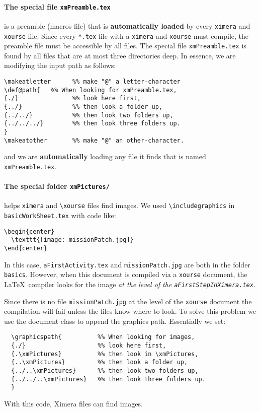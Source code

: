 \documentclass{ximera}
\begin{document}
\paragraph{The special file \texttt{xmPreamble.tex}} is a preamble (macros file) that is \textbf{automatically loaded} by every  \verb!ximera! and \verb!xourse! file.
Since every \verb!*.tex! file with a \verb!ximera! and \verb!xourse! must compile, the
preamble file must be accessible  by all files. The special file
\verb!xmPreamble.tex! is found by all files that are at most three directories
deep. In essence, we are modifying the input path as follows:
\begin{verbatim}
\makeatletter      %% make "@" a letter-character
\def@path{   %% When looking for xmPreamble.tex,
{./}               %% look here first,
{../}              %% then look a folder up,
{../../}           %% then look two folders up,
{../../../}        %% then look three folders up.
}
\makeatother       %% make "@" an other-character.
\end{verbatim}
and we are \textbf{automatically} loading any file it finds that is named \verb!xmPreamble.tex!.



\paragraph{The special folder \texttt{xmPictures/}} helps \verb!ximera! and  \verb!\xourse! files find images.
We used \verb!\includegraphics! in \texttt{basicWorkSheet.tex} with code like:
\begin{verbatim} 
\begin{center}
  \texttt{[image: missionPatch.jpg]}
\end{center}
\end{verbatim}
In this case, \texttt{aFirstActivity.tex}  and \verb!missionPatch.jpg! are both
in the folder
\texttt{basics}. However, when
this document is compiled via a \verb!xourse! document, the \LaTeX\ compiler
looks for the image \textit{at the level of the
  \texttt{aFirstStepInXimera.tex}}.

Since there is no file \verb!missionPatch.jpg! at the
level of the
\verb!xourse! document the compilation will fail unless the files know where to look. To solve this
problem we use the document class to append the graphics path. Essentially we set:
\begin{verbatim}
  \graphicspath{          %% When looking for images,
  {./}                    %% look here first,
  {.\xmPictures}          %% then look in \xmPictures,
  {..\xmPictures}         %% then look a folder up,
  {../..\xmPictures}      %% then look two folders up,
  {../../..\xmPictures}   %% then look three folders up.
  }
  \end{verbatim}
With this code, Ximera files can find images. 
\end{document}
